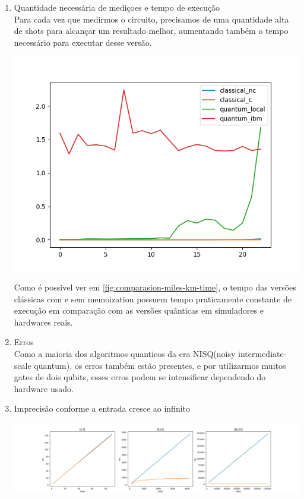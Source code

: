 \documentclass{article}
\begin{document}
\begin{enumerate}
\item{Quantidade necessária de mediçoes e tempo de execução}\\
Para cada vez que medirmos o circuito, precisamos de uma quantidade alta de shots para alcançar um resultado melhor, aumentando também o tempo necessário para executar desse versão.

\begin{center}
	\includegraphics[scale=0.6]{comparison_miles_to_km.png}
	\label{fig:comparasion-miles-km-time}
\end{center}

Como é possivel ver em \ref{fig:comparasion-miles-km-time}, o tempo das versões clássicas com e sem memoization possuem tempo praticamente constante de execução em comparação com as versões quânticas em simuladores e hardwares reais.


\item{Erros}\\
Como a maioria dos algoritmos quanticos da era NISQ(noisy intermediate-scale quantum), os erros também estão presentes, e por utilizarmos muitos gates de dois qubits, esses erros podem se intensificar dependendo do hardware usado.

\item{Imprecisão conforme a entrada cresce ao infinito}\\

\begin{center}
	\includegraphics[scale=0.2]{miles_to_km_defiance.png}
	\label{fig:values-miles-km-quantum}
\end{center}


\end{enumerate}
\end{document}
